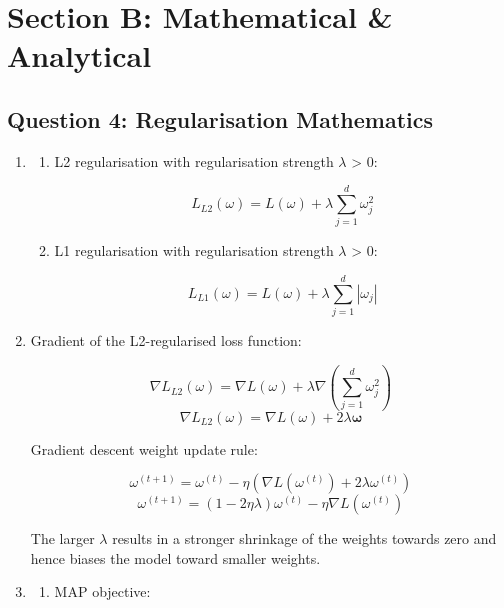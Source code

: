 \section{Section B: Mathematical \& Analytical}

\subsection{Question 4: Regularisation Mathematics}

\begin{enumerate}[label=\textbf{(\alph*)}, leftmargin=*, align=left]
    \item \begin{enumerate}[label=\roman*., topsep=0pt, itemsep=2pt]
                \item L2 regularisation with regularisation strength $\lambda$ > 0:
                
                      \[L_{L2}(\omega) = L(\omega) + \lambda \sum_{j = 1}^{d} \omega_j^2\]    

                \item L1 regularisation with regularisation strength $\lambda$ > 0:
                
                      \[L_{L1}(\omega) = L(\omega) + \lambda \sum_{j = 1}^{d} |\omega_j|\]    

                
          \end{enumerate}

    \item Gradient of the L2-regularised loss function:
    
          \[\nabla L_{L2}(\omega) = \nabla L(\omega) + \lambda \nabla (\sum_{j = 1}^{d} \omega_j^2)\] 
          \[\nabla L_{L2}(\omega) = \nabla L(\omega) + 2\lambda \boldsymbol{\omega}\]

          Gradient descent weight update rule:

          \[\omega^{(t+1)} = \omega^{(t)} - \eta (\nabla L(\omega^{(t)}) + 2\lambda \omega^{(t)})\]
          \[\omega^{(t+1)} = (1 - 2\eta\lambda)\omega^{(t)} - \eta \nabla L(\omega^{(t)})\]

          The larger $\lambda$ results in a stronger shrinkage of the weights towards zero and hence biases the model toward smaller weights.
    
    \item \begin{enumerate}[label=\roman*., topsep=0pt, itemsep=2pt]
                \item MAP objective:
                

\end{enumerate}
\end{enumerate}
